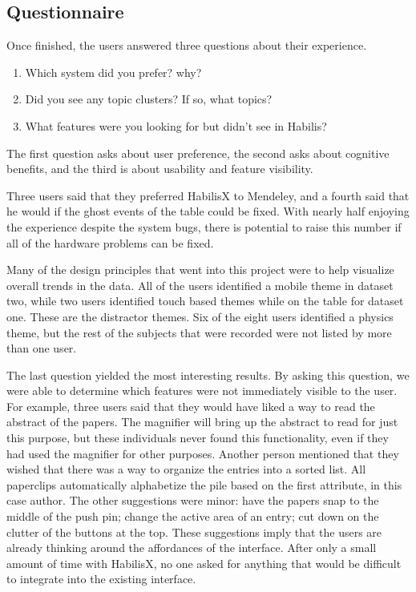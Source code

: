 \documentclass{article}
\begin{document}
\subsection*{Questionnaire}
Once finished, the users answered three questions about their experience.  
	\begin{enumerate}
	\item Which system did you prefer? why?
	\item Did you see any topic clusters?  If so, what topics?
	\item What features were you looking for but didn't see in Habilis?
	\end{enumerate}

The first question asks about user preference, the second asks about cognitive benefits, and the third is  about usability and feature visibility.  

	Three users said that they preferred HabilisX to Mendeley, and a fourth said that he would if the ghost events of the table could be fixed.  With nearly half enjoying the experience despite the system bugs, there is potential to raise this number if all of the hardware problems can be fixed.  
	
	Many of the design principles that went into this project were to help visualize overall trends in the data.  All of the users identified a mobile theme in dataset two, while two users identified touch based themes while on the table for dataset one.    These are the distractor themes.  Six of the eight users identified a physics theme, but the rest of the subjects that were recorded were not listed by more than one user.  
	
	The last question yielded the most interesting results.  By asking this question, we were able to determine which features were not immediately visible to the user.  For example, three users said that they would have liked a way to read the abstract of the papers.  The magnifier will bring up the abstract to read for just this purpose, but these individuals never found this functionality, even if they had used the magnifier for other purposes.  Another person mentioned that they wished that there was a way to organize the entries into a sorted list.  All paperclips automatically alphabetize the pile based on the first attribute, in this case author.  The other suggestions were minor: have the papers snap to the middle of the push pin; change the active area of an entry; cut down on the clutter of the buttons at the top.  These suggestions imply that the users are already thinking around the affordances of the interface.  After only a small amount of time with HabilisX, no one asked for anything that would be difficult to integrate into the existing interface.  
\end{document}
